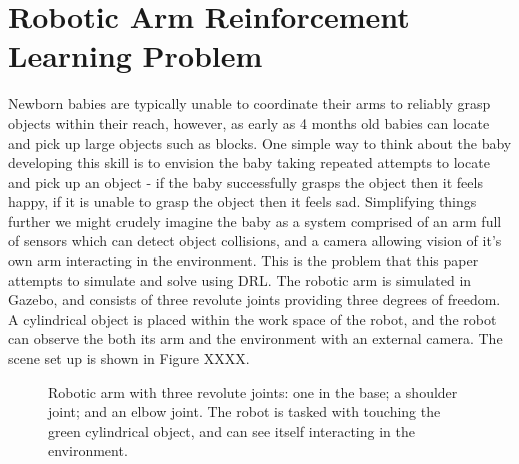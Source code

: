 \documentclass[a4paper]{article}
\begin{document}
\section{Robotic Arm Reinforcement Learning Problem}
Newborn babies are typically unable to coordinate their arms to reliably grasp objects within their reach, however, as early as 4 months old babies can locate and pick up large objects such as blocks. One simple way to think about the baby developing this skill is to envision the baby taking repeated attempts to locate and pick up an object - if the baby successfully grasps the object then it feels happy, if it is unable to grasp the object then it feels sad. Simplifying things further we might crudely imagine the baby as a system comprised of an arm full of sensors which can detect object collisions, and a camera allowing vision of it's own arm interacting in the environment. This is the problem that this paper attempts to simulate and solve using DRL. The robotic arm is simulated in Gazebo, and consists of three revolute joints providing three degrees of freedom. A cylindrical object is placed within the work space of the robot, and the robot can observe the both its arm and the environment with an external camera. The scene set up is shown in Figure XXXX.
\begin{figure}[h]
\centering
{}
\caption{Robotic arm with three revolute joints: one in the base; a shoulder joint; and an elbow joint. The robot is tasked with touching the green cylindrical object, and can see itself interacting in the environment.}
\end{figure}
\end{document}
